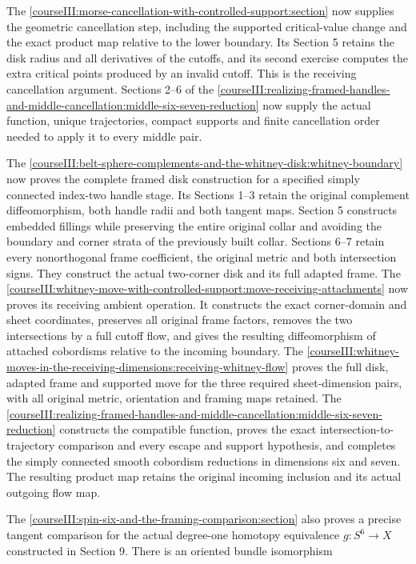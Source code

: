 The \cref{courseIII:morse-cancellation-with-controlled-support:section} now supplies the geometric cancellation step, including the supported critical-value change and the exact product map relative to the lower boundary. Its Section 5 retains the disk radius and all derivatives of the cutoffs, and its second exercise computes the extra critical points produced by an invalid cutoff. This is the receiving cancellation argument. Sections 2--6 of the \cref{courseIII:realizing-framed-handles-and-middle-cancellation:middle-six-seven-reduction} now supply the actual function, unique trajectories, compact supports and finite cancellation order needed to apply it to every middle pair.

The \cref{courseIII:belt-sphere-complements-and-the-whitney-disk:whitney-boundary} now proves the complete framed disk construction for a specified simply connected index-two handle stage. Its Sections 1--3 retain the original complement diffeomorphism, both handle radii and both tangent maps. Section 5 constructs embedded fillings while preserving the entire original collar and avoiding the boundary and corner strata of the previously built collar. Sections 6--7 retain every nonorthogonal frame coefficient, the original metric and both intersection signs. They construct the actual two-corner disk and its full adapted frame. The \cref{courseIII:whitney-move-with-controlled-support:move-receiving-attachments} now proves its receiving ambient operation. It constructs the exact corner-domain and sheet coordinates, preserves all original frame factors, removes the two intersections by a full cutoff flow, and gives the resulting diffeomorphism of attached cobordisms relative to the incoming boundary. The \cref{courseIII:whitney-moves-in-the-receiving-dimensions:receiving-whitney-flow} proves the full disk, adapted frame and supported move for the three required sheet-dimension pairs, with all original metric, orientation and framing maps retained. The \cref{courseIII:realizing-framed-handles-and-middle-cancellation:middle-six-seven-reduction} constructs the compatible function, proves the exact intersection-to-trajectory comparison and every escape and support hypothesis, and completes the simply connected smooth cobordism reductions in dimensions six and seven. The resulting product map retains the original incoming inclusion and its actual outgoing flow map.

The \cref{courseIII:spin-six-and-the-framing-comparison:section} also proves a precise tangent comparison for the actual degree-one homotopy equivalence \(g:S^6\to X\) constructed in Section 9. There is an oriented bundle isomorphism

